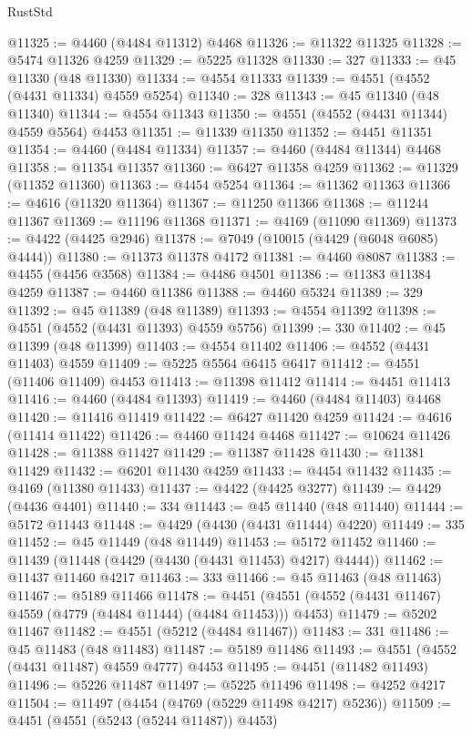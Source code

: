 \begin{lexlean}{RustStd}
\begin{coremodule}
@11325 := @4460 (@4484 @11312) @4468
@11326 := @11322 @11325
@11328 := @5474 @11326 @4259
@11329 := @5225 @11328
@11330 := 327
@11333 := @45 @11330 (@48 @11330)
@11334 := @4554 @11333
@11339 := @4551 (@4552 (@4431 @11334) @4559 @5254)
@11340 := 328
@11343 := @45 @11340 (@48 @11340)
@11344 := @4554 @11343
@11350 := @4551 (@4552 (@4431 @11344) @4559 @5564) @4453
@11351 := @11339 @11350
@11352 := @4451 @11351
@11354 := @4460 (@4484 @11334)
@11357 := @4460 (@4484 @11344) @4468
@11358 := @11354 @11357
@11360 := @6427 @11358 @4259
@11362 := @11329 (@11352 @11360)
@11363 := @4454 @5254
@11364 := @11362 @11363
@11366 := @4616 (@11320 @11364)
@11367 := @11250 @11366
@11368 := @11244 @11367
@11369 := @11196 @11368
@11371 := @4169 (@11090 @11369)
@11373 := @4422 (@4425 @2946)
@11378 := @7049 (@10015 (@4429 (@6048 @6085) @4444))
@11380 := @11373 @11378 @4172
@11381 := @4460 @8087
@11383 := @4455 (@4456 @3568)
@11384 := @4486 @4501
@11386 := @11383 @11384 @4259
@11387 := @4460 @11386
@11388 := @4460 @5324
@11389 := 329
@11392 := @45 @11389 (@48 @11389)
@11393 := @4554 @11392
@11398 := @4551 (@4552 (@4431 @11393) @4559 @5756)
@11399 := 330
@11402 := @45 @11399 (@48 @11399)
@11403 := @4554 @11402
@11406 := @4552 (@4431 @11403) @4559
@11409 := @5225 @5564 @6415 @6417
@11412 := @4551 (@11406 @11409) @4453
@11413 := @11398 @11412
@11414 := @4451 @11413
@11416 := @4460 (@4484 @11393)
@11419 := @4460 (@4484 @11403) @4468
@11420 := @11416 @11419
@11422 := @6427 @11420 @4259
@11424 := @4616 (@11414 @11422)
@11426 := @4460 @11424 @4468
@11427 := @10624 @11426
@11428 := @11388 @11427
@11429 := @11387 @11428
@11430 := @11381 @11429
@11432 := @6201 @11430 @4259
@11433 := @4454 @11432
@11435 := @4169 (@11380 @11433)
@11437 := @4422 (@4425 @3277)
@11439 := @4429 (@4436 @4401)
@11440 := 334
@11443 := @45 @11440 (@48 @11440)
@11444 := @5172 @11443
@11448 := @4429 (@4430 (@4431 @11444) @4220)
@11449 := 335
@11452 := @45 @11449 (@48 @11449)
@11453 := @5172 @11452
@11460 := @11439 (@11448 (@4429 (@4430 (@4431 @11453) @4217) @4444))
@11462 := @11437 @11460 @4217
@11463 := 333
@11466 := @45 @11463 (@48 @11463)
@11467 := @5189 @11466
@11478 := @4451 (@4551 (@4552 (@4431 @11467) @4559 (@4779 (@4484 @11444) (@4484 @11453))) @4453)
@11479 := @5202 @11467
@11482 := @4551 (@5212 (@4484 @11467))
@11483 := 331
@11486 := @45 @11483 (@48 @11483)
@11487 := @5189 @11486
@11493 := @4551 (@4552 (@4431 @11487) @4559 @4777) @4453
@11495 := @4451 (@11482 @11493)
@11496 := @5226 @11487
@11497 := @5225 @11496
@11498 := @4252 @4217
@11504 := @11497 (@4454 (@4769 (@5229 @11498 @4217) @5236))
@11509 := @4451 (@4551 (@5243 (@5244 @11487)) @4453)

\end{coremodule}
\end{lexlean}
